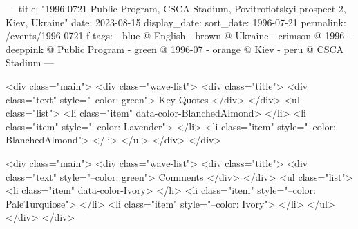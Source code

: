 ---
title: "1996-0721 Public Program, CSCA Stadium, Povitroflotskyi prospect 2, Kiev, Ukraine"
date: 2023-08-15
display_date: 
sort_date: 1996-07-21
permalink: /events/1996-0721-f
tags:
  - blue @ English
  - brown @ Ukraine
  - crimson @ 1996
  - deeppink @ Public Program
  - green @ 1996-07 
  - orange @ Kiev
  - peru @ CSCA Stadium
---

<div class="main">
  <div class="wave-list">
    <div class="title">
      <div class="text" style="--color: green">
        Key Quotes
      </div>
    </div>
    <ul class="list">
        <li class="item" data-color-BlanchedAlmond>
        </li>
        <li class="item" style="--color: Lavender">
        </li>
        <li class="item" style="--color: BlanchedAlmond">
        </li>
      </ul>
  </div>
</div>

<div class="main">
  <div class="wave-list">
    <div class="title">
      <div class="text" style="--color: green">
        Comments
      </div>
    </div>
    <ul class="list">
        <li class="item" data-color-Ivory>
        </li>
        <li class="item" style="--color: PaleTurquiose">
        </li>
        <li class="item" style="--color: Ivory">
        </li>
      </ul>
  </div>
</div>